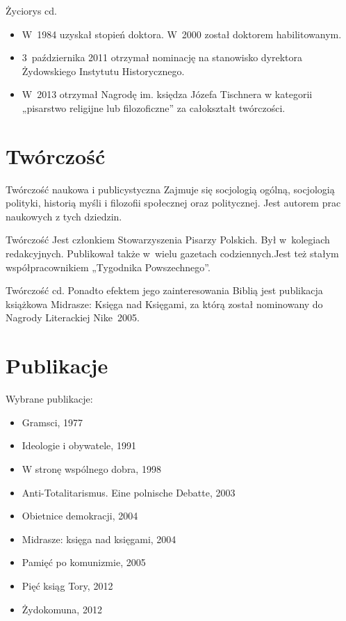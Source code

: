 \documentclass{beamer}
\begin{document}
\begin{frame}{Życiorys cd.}
\begin {itemize}
\item<1> W~1984 uzyskał stopień doktora. W~2000 został doktorem habilitowanym.
\pause
\item<2>3~października 2011 otrzymał nominację na stanowisko dyrektora Żydowskiego Instytutu Historycznego.
\item<3> W~2013 otrzymał Nagrodę im. księdza Józefa Tischnera w kategorii „pisarstwo religijne lub filozoficzne” za całokształt twórczości.
\end {itemize}
\end {frame}

\section{Twórczość}
\begin{frame}{Twórczość naukowa i publicystyczna}
Zajmuje się socjologią ogólną, socjologią polityki, historią myśli i filozofii społecznej oraz politycznej. Jest autorem prac naukowych z tych dziedzin.
\end {frame}

\begin{frame}{Twórczość}
Jest członkiem Stowarzyszenia Pisarzy Polskich. Był w~kolegiach redakcyjnych. Publikował także w~wielu gazetach codziennych.Jest też stałym współpracownikiem „Tygodnika Powszechnego”.
\end {frame}

\begin{frame}{Twórczość cd.}
Ponadto efektem jego zainteresowania Biblią jest publikacja książkowa Midrasze: Księga nad Księgami, za którą został nominowany do Nagrody Literackiej Nike~2005.
\end {frame}

\section{Publikacje}
\begin{frame}{Wybrane publikacje:}
\begin {itemize}
\pause
\item Gramsci, 1977 \pause
\item Ideologie i obywatele, 1991 \pause
\item W stronę wspólnego dobra, 1998 \pause
\item Anti-Totalitarismus. Eine polnische Debatte, 2003 \pause
\item Obietnice demokracji, 2004 \pause
\item Midrasze: księga nad księgami, 2004 \pause
\item Pamięć po komunizmie, 2005 \pause
\item Pięć ksiąg Tory, 2012 \pause
\item Żydokomuna, 2012 
\end {itemize} 
\end {frame}
\end{document}
